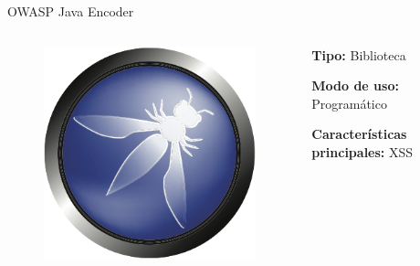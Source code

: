 \documentclass[12pt]{beamer}
\begin{document}
\begin{frame}{OWASP Java Encoder}
  \begin{columns}
      \begin{column}{.5\linewidth}
  	    \begin{figure}
  	    \centering
  	    \includegraphics[width=0.6\linewidth]{Images/owasp}
  	    \end{figure}
      \end{column}
    \begin{column}{.5\linewidth}
	    \textbf{Tipo:} Biblioteca
	    
	    \textbf{Modo de uso:} Programático
	    
	    \textbf{Características principales:}
	    XSS
    \end{column}

  \end{columns}
\end{frame}
\end{document}
